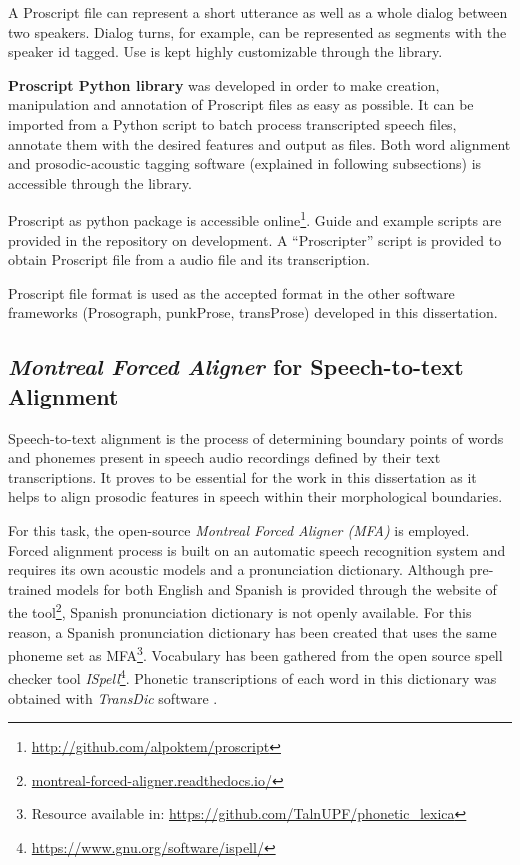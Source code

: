 A Proscript file can represent a short utterance as well as a whole dialog between two speakers. Dialog turns, for example, can be represented as segments with the speaker id tagged. Use is kept highly customizable through the library. 

\textbf{Proscript Python library} was developed in order to make creation, manipulation and annotation of Proscript files as easy as possible. It can be imported from a Python script to batch process transcripted speech files, annotate them with the desired features and output as files. Both word alignment and prosodic-acoustic tagging software (explained in following subsections) is accessible through the library. 

Proscript as python package is accessible online\footnote{\url{http://github.com/alpoktem/proscript}}. Guide and example scripts are provided in the repository on development. A ``Proscripter'' script is provided to obtain Proscript file from a audio file and its transcription. 

Proscript file format is used as the accepted format in the other software frameworks (Prosograph, punkProse, transProse) developed in this dissertation.

\subsection*{\textit{Montreal Forced Aligner} for Speech-to-text Alignment}
Speech-to-text alignment is the process of determining boundary points of words and phonemes present in speech audio recordings defined by their text transcriptions. It proves to be essential for the work in this dissertation as it helps to align prosodic features in speech within their morphological boundaries. 

For this task, the open-source \textit{Montreal Forced Aligner (MFA)} \citep{mfa} is employed. Forced alignment process is built on an automatic speech recognition system and requires its own acoustic models and a pronunciation dictionary. Although pre-trained models for both English and Spanish is provided through the website of the tool\footnote{\url{montreal-forced-aligner.readthedocs.io/}}, Spanish pronunciation dictionary is not openly available. For this reason, a Spanish pronunciation dictionary has been created that uses the same phoneme set as MFA\footnote{Resource available in: \url{https://github.com/TalnUPF/phonetic_lexica}}. Vocabulary has been gathered from the open source spell checker tool \textit{ISpell}\footnote{\url{https://www.gnu.org/software/ispell/}}. Phonetic transcriptions of each word in this dictionary was obtained with \textit{TransDic} software \citep{Garrido2018}.

